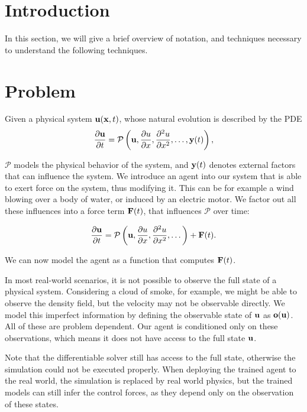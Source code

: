 \documentclass[acmtog]{techreportacmart}
\begin{document}
\section{Introduction}
In this section, we will give a brief overview of notation, and techniques
necessary to understand the following techniques.

\section{Problem}
Given a physical system $\vb{u}(\vb{x}, t)$, whose natural evolution is
described by the PDE
\begin{equation}
  \label{eq:problem-pde}
  \pdv{\vb{u}}{t} = 
  \mathcal{P} \left( 
    \vb{u},
    \pdv{u}{x},
    \pdv[2]{u}{x},
    \dots,
    \vb{y}(t)
  \right),
\end{equation}

$\mathcal{P}$ models the physical behavior of the system, and $\vb{y}(t)$
denotes external factors that can influence the system. We introduce an agent
into our system that is able to exert force on the system, thus modifying it.
This can be for example a wind blowing over a body of water, or induced by an
electric motor. We factor out all these influences into a force term
$\vb{F}(t)$, that influences $\mathcal{P}$ over time:

\begin{equation}
  \label{eq:problem-pde}
  \pdv{\vb{u}}{t} = 
  \mathcal{P} \left( 
    \vb{u},
    \pdv{u}{x},
    \pdv[2]{u}{x},
    \dots
  \right) +
  \vb{F}(t).
\end{equation}

We can now model the agent as a function that computes $\vb{F}(t)$.

In most real-world scenarios, it is not possible to observe the full state of
a physical system. Considering a cloud of smoke, for example, we might be able
to observe the density field, but the velocity may not be observable directly.
We model this imperfect information by defining the observable state of $\vb{u}$
as $\vb{o}(\vb{u})$. All of these are problem dependent. Our agent is
conditioned only on these observations, which means it does not have access to
the full state $\vb{u}$. 

Note that the differentiable solver still has access to the full state,
otherwise the simulation could not be executed properly. When deploying the
trained agent to the real world, the simulation is replaced by real world
physics, but the trained models can still infer the control forces, as they
depend only on the observation of these states. 
\end{document}
